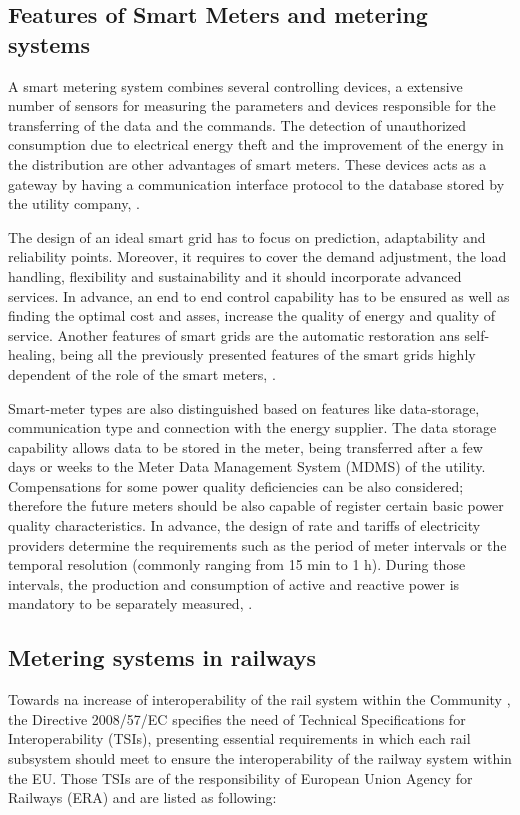 \subsection{Features of Smart Meters and metering systems}

A smart metering system combines several controlling devices, a extensive number of sensors for measuring the parameters and devices responsible for the transferring of the data and the commands. The detection of unauthorized consumption due to electrical energy theft and the improvement of the energy in the distribution are other advantages of smart meters. These devices acts as a gateway by having a communication interface protocol to the database stored by the utility company, \cite{Reddy2014}.

The design of an ideal smart grid has to focus on prediction, adaptability and reliability points. Moreover, it requires to cover the demand adjustment, the load handling, flexibility and sustainability and it should incorporate advanced services. In advance, an end to end control capability has to be ensured as well as finding the optimal cost and asses, increase the quality of energy and quality of service. Another features of smart grids are the automatic restoration ans self-healing, being all the previously presented features of the smart grids highly dependent of the role of the smart meters, \cite{Mohassel2014}.

Smart-meter types are also distinguished based on features like data-storage, communication type and connection with the energy supplier. The data storage capability allows data to be stored in the meter, being transferred after a few days or weeks to the Meter Data Management System (MDMS) of the utility. Compensations for some power quality deficiencies can be also considered; therefore the future meters should be also capable of register certain basic power quality characteristics. In advance, the design of rate and tariffs of electricity providers determine the requirements such as the period of meter intervals or the temporal resolution (commonly ranging from 15 min to 1 h). During those intervals, the production and consumption of active and reactive power is mandatory to be separately measured, \cite{Siano2014}.

\subsection{Metering systems in railways}

Towards na increase of interoperability of the rail system within the Community \cite{eur-lex2008}, the Directive 2008/57/EC specifies the need of Technical Specifications for Interoperability (TSIs), presenting essential requirements in which each rail subsystem should meet to ensure the interoperability of the railway system within the EU. Those TSIs are of the responsibility of European Union Agency for Railways (ERA) and are listed as following:

